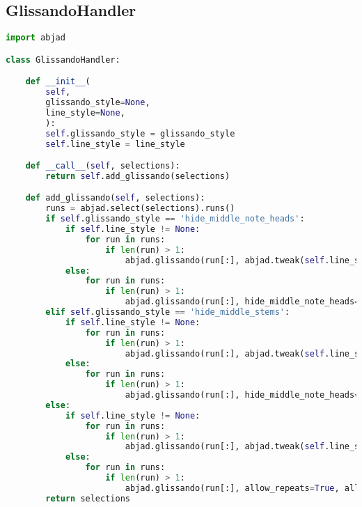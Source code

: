 \subsection{GlissandoHandler}
\singlespace
\begin{lstlisting}[language=Python, caption=GlisssandoHandler]
import abjad

class GlissandoHandler:

    def __init__(
        self,
        glissando_style=None,
        line_style=None,
        ):
        self.glissando_style = glissando_style
        self.line_style = line_style

    def __call__(self, selections):
        return self.add_glissando(selections)

    def add_glissando(self, selections):
        runs = abjad.select(selections).runs()
        if self.glissando_style == 'hide_middle_note_heads':
            if self.line_style != None:
                for run in runs:
                    if len(run) > 1:
                        abjad.glissando(run[:], abjad.tweak(self.line_style).style, hide_middle_note_heads=True, )
            else:
                for run in runs:
                    if len(run) > 1:
                        abjad.glissando(run[:], hide_middle_note_heads=True, )
        elif self.glissando_style == 'hide_middle_stems':
            if self.line_style != None:
                for run in runs:
                    if len(run) > 1:
                        abjad.glissando(run[:], abjad.tweak(self.line_style).style, hide_middle_note_heads=True, hide_middle_stems=True, )
            else:
                for run in runs:
                    if len(run) > 1:
                        abjad.glissando(run[:], hide_middle_note_heads=True, hide_middle_stems=True, )
        else:
            if self.line_style != None:
                for run in runs:
                    if len(run) > 1:
                        abjad.glissando(run[:], abjad.tweak(self.line_style).style, allow_repeats=True, allow_ties=True, )
            else:
                for run in runs:
                    if len(run) > 1:
                        abjad.glissando(run[:], allow_repeats=True, allow_ties=True, )
        return selections
\end{lstlisting}
\doublespace

